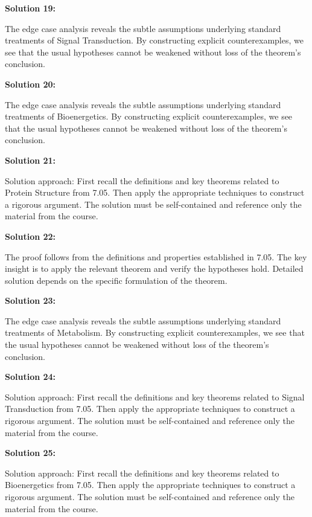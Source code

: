 \documentclass[12pt,a4paper]{exam}
\begin{document}
\vspace{0.5cm}

\textbf{Solution 19:}

The edge case analysis reveals the subtle assumptions underlying standard treatments of Signal Transduction. By constructing explicit counterexamples, we see that the usual hypotheses cannot be weakened without loss of the theorem's conclusion.

\vspace{0.5cm}

\textbf{Solution 20:}

The edge case analysis reveals the subtle assumptions underlying standard treatments of Bioenergetics. By constructing explicit counterexamples, we see that the usual hypotheses cannot be weakened without loss of the theorem's conclusion.

\vspace{0.5cm}

\textbf{Solution 21:}

Solution approach: First recall the definitions and key theorems related to Protein Structure from 7.05. Then apply the appropriate techniques to construct a rigorous argument. The solution must be self-contained and reference only the material from the course.

\vspace{0.5cm}

\textbf{Solution 22:}

The proof follows from the definitions and properties established in 7.05. The key insight is to apply the relevant theorem and verify the hypotheses hold. Detailed solution depends on the specific formulation of the theorem.

\vspace{0.5cm}

\textbf{Solution 23:}

The edge case analysis reveals the subtle assumptions underlying standard treatments of Metabolism. By constructing explicit counterexamples, we see that the usual hypotheses cannot be weakened without loss of the theorem's conclusion.

\vspace{0.5cm}

\textbf{Solution 24:}

Solution approach: First recall the definitions and key theorems related to Signal Transduction from 7.05. Then apply the appropriate techniques to construct a rigorous argument. The solution must be self-contained and reference only the material from the course.

\vspace{0.5cm}

\textbf{Solution 25:}

Solution approach: First recall the definitions and key theorems related to Bioenergetics from 7.05. Then apply the appropriate techniques to construct a rigorous argument. The solution must be self-contained and reference only the material from the course.

\vspace{0.5cm}
\end{document}
